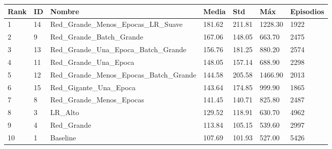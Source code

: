 \begin{tabular}{lllllll}
\toprule
Rank & ID & Nombre & Media & Std & Máx & Episodios \\
\midrule
1 & 14 & Red_Grande_Menos_Epocas_LR_Suave & 181.62 & 211.81 & 1228.30 & 1922 \\
2 & 9 & Red_Grande_Batch_Grande & 167.06 & 148.05 & 663.70 & 2475 \\
3 & 13 & Red_Grande_Una_Epoca_Batch_Grande & 156.76 & 181.25 & 880.20 & 2574 \\
4 & 11 & Red_Grande_Una_Epoca & 148.05 & 157.14 & 688.90 & 2298 \\
5 & 12 & Red_Grande_Menos_Epocas_Batch_Grande & 144.58 & 205.58 & 1466.90 & 2013 \\
6 & 15 & Red_Gigante_Una_Epoca & 143.64 & 174.85 & 999.90 & 1865 \\
7 & 8 & Red_Grande_Menos_Epocas & 141.45 & 140.71 & 825.80 & 2487 \\
8 & 3 & LR_Alto & 129.52 & 118.91 & 630.70 & 4962 \\
9 & 4 & Red_Grande & 113.84 & 105.15 & 539.60 & 2997 \\
10 & 1 & Baseline & 107.69 & 101.93 & 527.00 & 5426 \\
\bottomrule
\end{tabular}
